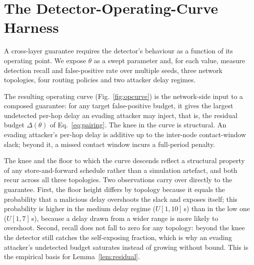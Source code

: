 \section{The Detector-Operating-Curve Harness}
\label{sec:harness}
A cross-layer guarantee requires the detector's behaviour as a function of its
operating point. We expose $\theta$ as a swept parameter and, for each value,
measure detection recall and false-positive rate over multiple seeds, three
network topologies, four routing policies and two attacker delay regimes.

The resulting operating curve (Fig.~\ref{fig:opcurve}) is the network-side input
to a composed guarantee: for any target false-positive budget, it gives the
largest undetected per-hop delay an evading attacker may inject, that is,
the residual budget $\Delta(\theta)$ of Eq.~\eqref{eq:pairing}. The knee in the
curve is structural. An evading attacker's per-hop delay is additive up to the
inter-node contact-window slack; beyond it, a missed contact window incurs a
full-period penalty.

The knee and the floor to which the curve descends reflect a structural
property of any store-and-forward schedule rather than a simulation artefact,
and both recur across all three topologies. Two observations carry over
directly to the guarantee. First, the floor height differs by topology because
it equals the probability that a malicious delay overshoots the slack and
exposes itself; this probability is higher in the medium delay regime
($U[1,10]$\,s) than in the low one ($U[1,7]$\,s), because a delay drawn from a
wider range is more likely to overshoot. Second, recall does not fall to zero
for any topology: beyond the knee the detector still catches the self-exposing
fraction, which is why an evading attacker's undetected budget saturates
instead of growing without bound. This is the empirical basis for
Lemma~\ref{lem:residual}.


